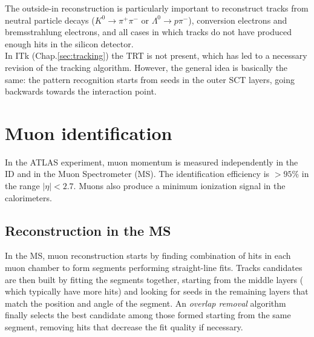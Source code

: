\documentclass[a4paper,twoside,12pt]{book}
\begin{document}
The outside-in reconstruction is particularly important to reconstruct tracks from neutral particle decays ($K^0 \rightarrow \pi^+\pi^-$ or $\Lambda^0 \rightarrow p\pi^-$), conversion
electrons and bremsstrahlung electrons, and all cases in which tracks do not have
produced enough hits in the silicon detector. \\

In ITk (Chap.\ref{sec:tracking}) the TRT is not present, which has led to a necessary revision of the tracking algorithm. However, the general idea is basically the same:
the pattern recognition starts from seeds in the outer SCT layers, going backwards towards the interaction point\cite{Claudia}.

\section{Muon identification}
In the ATLAS experiment, muon momentum is measured independently in the ID and in the
Muon Spectrometer (MS). The identification efficiency is \mbox{$> 95\%$\cite{PhysicsObjectReconstruction}} in the
range $|\eta| < 2.7$. Muons also produce a minimum ionization signal in the calorimeters.\\

\subsection*{Reconstruction in the MS}
In the MS, muon reconstruction starts by finding combination of hits in each muon chamber
to form segments performing straight-line fits. Tracks candidates are then built by fitting the
segments together\cite{muonReconstruction}, starting from the middle layers (
which typically have more hits) and looking for seeds in the remaining layers that match
the position and angle of the segment. An \textit{overlap removal} algorithm finally
selects the best candidate among those formed starting from the same segment, 
removing hits that decrease the fit quality if necessary.
\end{document}

